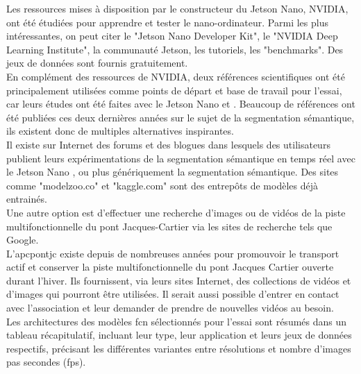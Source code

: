 ﻿\noindent Les ressources mises à disposition par le constructeur du Jetson Nano, NVIDIA, ont été étudiées pour apprendre et tester le nano-ordinateur. Parmi les plus intéressantes, on peut citer le "Jetson Nano Developer Kit", le "NVIDIA Deep Learning Institute", la communauté Jetson, les tutoriels, les "benchmarks". Des jeux de données sont fournis gratuitement.
\vspace{0.5\baselineskip}
\\
\noindent En complément des ressources de NVIDIA, deux références scientifiques ont été principalement utilisées comme points de départ et base de travail pour l'essai, car leurs études ont été faites avec le Jetson Nano \parencite{nguyen_mavnet_2019} et \parencite{zheng_real-time_2020}. Beaucoup de références ont été publiées ces deux dernières années sur le sujet de la segmentation sémantique, ils existent donc de multiples alternatives inspirantes.
\vspace{0.5\baselineskip}
\\
\noindent Il existe sur Internet des forums et des blogues dans lesquels des utilisateurs publient leurs expérimentations de la segmentation sémantique en temps réel avec le Jetson Nano \parencite{dustin_realtime_2019}, ou plus génériquement la segmentation sémantique. Des sites comme "modelzoo.co" et "kaggle.com" sont des entrepôts de modèles déjà entrainés. 
\vspace{0.5\baselineskip}
\\
\noindent Une autre option est d'effectuer une recherche d'images ou de vidéos de la piste multifonctionnelle du pont Jacques-Cartier via les sites de recherche tels que Google. 
\vspace{0.5\baselineskip}
\\
\noindent L'\acrlong{apcpontjc} existe depuis de nombreuses années pour promouvoir le transport actif et conserver la piste multifonctionnelle du pont Jacques Cartier ouverte durant l'hiver. Ils fournissent, via leurs sites Internet, des collections de vidéos et d'images qui pourront être utilisées. Il serait aussi possible d'entrer en contact avec l'association et leur demander de prendre de nouvelles vidéos au besoin. \parencite{association_des_pietons_et_cyclistes_du_pont_jacques-cartier_pontjacques-cartier365com_2020, association_des_pietons_et_cyclistes_pont_jacques-cartier_flickr_2020}
\vspace{0.5\baselineskip}
\\
\noindent Les architectures des modèles \acrshort{fcn} sélectionnés pour l'essai sont résumés dans un tableau récapitulatif, incluant leur type, leur application et leurs jeux de données respectifs, précisant les différentes variantes entre résolutions et nombre d'images pas secondes (\acrshort{fps}).